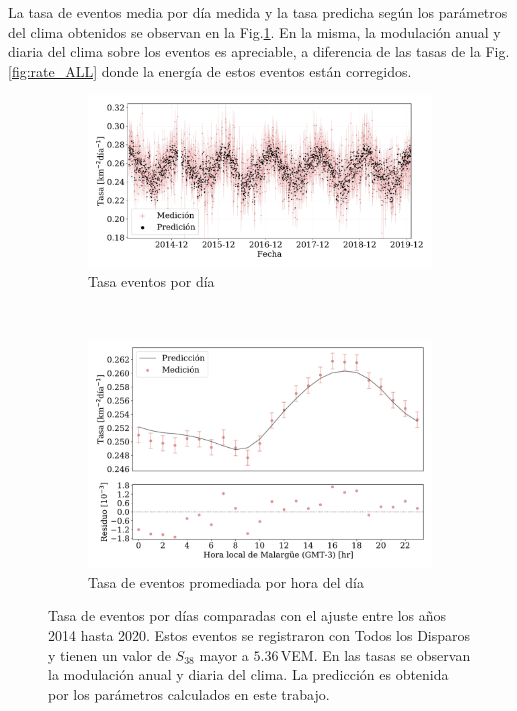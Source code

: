 La tasa de eventos media por día  medida y la tasa predicha según los parámetros del clima obtenidos se observan en la Fig.\ref{fig:rate_dayly_AllTriggers}. En la misma, la modulación anual y diaria del clima sobre los eventos es apreciable, a diferencia de las tasas de la Fig.\,\ref{fig:rate_ALL} donde  la energía de estos eventos están corregidos.  
\begin{figure}
\centering
  \begin{subfigure}[b]{0.9\textwidth}
  \includegraphics[width=\textwidth]{Graphs/rate_dayly/AllTriggers_S38_over_1EeV_rate_v3.pdf}
  \caption{Tasa eventos por día}\label{fig:rate_dayly_AllTriggers}
  \end{subfigure}\\
  \begin{subfigure}[b]{0.9\textwidth}
  \includegraphics[width=\textwidth]{Graphs/rate_hour_of_the_day/AllTriggers_S38_over_1EeV_hour_of_the_day.pdf}
  \caption{Tasa de eventos promediada por hora del día }\label{fig:rate_hod_AllTriggers}
  \end{subfigure}
  \caption{Tasa de eventos por días comparadas con el ajuste entre los años 2014 hasta 2020. Estos eventos se registraron con Todos los Disparos  y tienen un valor de $S_{38}$ mayor a $5.36\,$VEM. En las tasas se observan la modulación anual y diaria del clima. La predicción es obtenida por los parámetros calculados en este trabajo.}\label{fig:rate__AllTriggers}
\end{figure}

